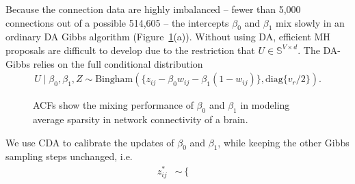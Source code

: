 \documentclass[twoside,11pt]{article}
\newcommand{\bb}[1]{\mathbb{#1}}
\newcommand{\diag}{\text{diag}}
\newcommand{\1}{\mathbf 1}
\begin{document}
{Because the connection data are highly imbalanced -- fewer than 5,000 connections out of a possible 514,605 -- the intercepts $\beta_0$ and $\beta_1$ mix slowly in an ordinary DA Gibbs algorithm (Figure~\ref{fig:network_model}(a)).   Without using DA, efficient MH proposals are difficult to develop due to the restriction that $U\in\bb{S}^{V\times d}$. The DA-Gibbs relies on the full conditional distribution
\begin{equation*}
	\begin{aligned}
    U\mid \beta_0,\beta_1,Z \sim \text{Bingham}( \{z_{ij}- \beta_0w_{ij}-\beta_1(1-w_{ij}) \}, \diag\{v_r/2\}).
	\end{aligned}
\end{equation*}


\begin{figure}[H]
  {
    \qquad
  }
    {\caption{ACFs show the mixing performance of $\beta_0$ and $\beta_1$ in modeling average sparsity in network connectivity of a brain. \label{fig:network_model}}}
\end{figure}
We use CDA to calibrate the updates of $\beta_0$ and $\beta_1$, while keeping the other Gibbs sampling steps unchanged, i.e.
\begin{equation*}
	\begin{aligned}
     z^*_{ij} & \sim \left\{
    \begin{array}{lcc}

\end{array}
\end{aligned}
\end{equation*}}
\end{document}
